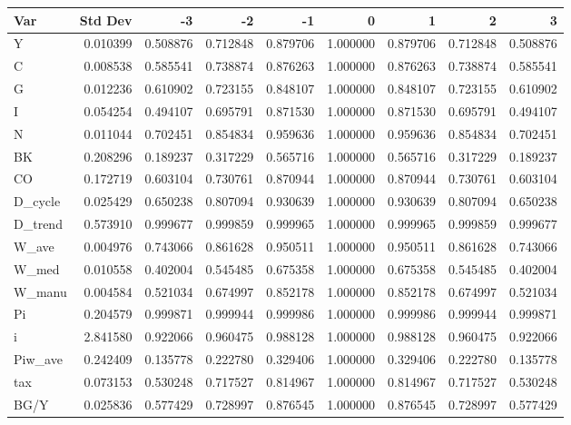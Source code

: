 \begin{tabular}{lrrrrrrrr}
\toprule
Var & Std Dev & -3 & -2 & -1 & 0 & 1 & 2 & 3 \\
\midrule
Y & 0.010399 & 0.508876 & 0.712848 & 0.879706 & 1.000000 & 0.879706 & 0.712848 & 0.508876 \\
C & 0.008538 & 0.585541 & 0.738874 & 0.876263 & 1.000000 & 0.876263 & 0.738874 & 0.585541 \\
G & 0.012236 & 0.610902 & 0.723155 & 0.848107 & 1.000000 & 0.848107 & 0.723155 & 0.610902 \\
I & 0.054254 & 0.494107 & 0.695791 & 0.871530 & 1.000000 & 0.871530 & 0.695791 & 0.494107 \\
N & 0.011044 & 0.702451 & 0.854834 & 0.959636 & 1.000000 & 0.959636 & 0.854834 & 0.702451 \\
BK & 0.208296 & 0.189237 & 0.317229 & 0.565716 & 1.000000 & 0.565716 & 0.317229 & 0.189237 \\
CO & 0.172719 & 0.603104 & 0.730761 & 0.870944 & 1.000000 & 0.870944 & 0.730761 & 0.603104 \\
D_cycle & 0.025429 & 0.650238 & 0.807094 & 0.930639 & 1.000000 & 0.930639 & 0.807094 & 0.650238 \\
D_trend & 0.573910 & 0.999677 & 0.999859 & 0.999965 & 1.000000 & 0.999965 & 0.999859 & 0.999677 \\
W_ave & 0.004976 & 0.743066 & 0.861628 & 0.950511 & 1.000000 & 0.950511 & 0.861628 & 0.743066 \\
W_med & 0.010558 & 0.402004 & 0.545485 & 0.675358 & 1.000000 & 0.675358 & 0.545485 & 0.402004 \\
W_manu & 0.004584 & 0.521034 & 0.674997 & 0.852178 & 1.000000 & 0.852178 & 0.674997 & 0.521034 \\
Pi & 0.204579 & 0.999871 & 0.999944 & 0.999986 & 1.000000 & 0.999986 & 0.999944 & 0.999871 \\
i & 2.841580 & 0.922066 & 0.960475 & 0.988128 & 1.000000 & 0.988128 & 0.960475 & 0.922066 \\
Piw_ave & 0.242409 & 0.135778 & 0.222780 & 0.329406 & 1.000000 & 0.329406 & 0.222780 & 0.135778 \\
tax & 0.073153 & 0.530248 & 0.717527 & 0.814967 & 1.000000 & 0.814967 & 0.717527 & 0.530248 \\
BG/Y & 0.025836 & 0.577429 & 0.728997 & 0.876545 & 1.000000 & 0.876545 & 0.728997 & 0.577429 \\
\bottomrule
\end{tabular}
